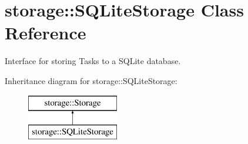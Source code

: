 \hypertarget{classstorage_1_1SQLiteStorage}{
\section{storage\-:\-:\-S\-Q\-Lite\-Storage \-Class \-Reference}
\label{classstorage_1_1SQLiteStorage}
}


\-Interface for storing \-Tasks to a \-S\-Q\-Lite database.  


\-Inheritance diagram for storage\-:\-:\-S\-Q\-Lite\-Storage\-:\begin{figure}[H]
\begin{center}
\leavevmode
\includegraphics[height=2.000000cm]{classstorage_1_1SQLiteStorage}
\end{center}
\end{figure}
